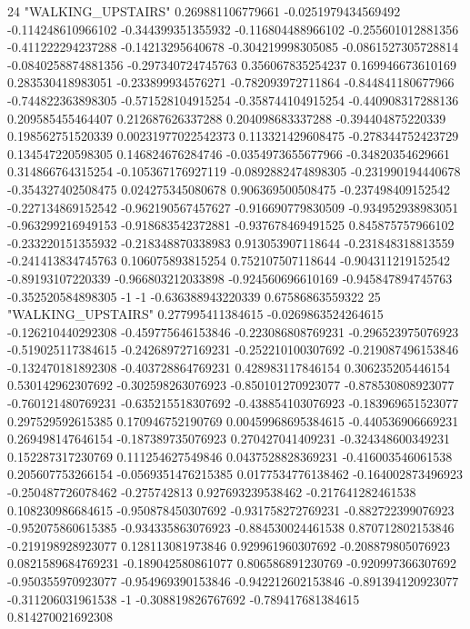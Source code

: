 24 "WALKING_UPSTAIRS" 0.269881106779661 -0.0251979434569492 -0.114248610966102 -0.344399351355932 -0.116804488966102 -0.255601012881356 -0.411222294237288 -0.14213295640678 -0.304219998305085 -0.0861527305728814 -0.0840258874881356 -0.297340724745763 0.356067835254237 0.169946673610169 0.283530418983051 -0.233899934576271 -0.782093972711864 -0.844841180677966 -0.744822363898305 -0.571528104915254 -0.358744104915254 -0.440908317288136 0.209585455464407 0.212687626337288 0.204098683337288 -0.394404875220339 0.198562751520339 0.00231977022542373 0.113321429608475 -0.278344752423729 0.134547220598305 0.146824676284746 -0.0354973655677966 -0.34820354629661 0.314866764315254 -0.105367176927119 -0.0892882474898305 -0.231990194440678 -0.354327402508475 0.024275345080678 0.906369500508475 -0.237498409152542 -0.227134869152542 -0.962190567457627 -0.916690779830509 -0.934952938983051 -0.963299216949153 -0.918683542372881 -0.937678469491525 0.845875757966102 -0.233220151355932 -0.218348870338983 0.913053907118644 -0.231848318813559 -0.241413834745763 0.106075893815254 0.752107507118644 -0.904311219152542 -0.89193107220339 -0.966803212033898 -0.924560696610169 -0.945847894745763 -0.352520584898305 -1 -1 -0.636388943220339 0.67586863559322
25 "WALKING_UPSTAIRS" 0.277995411384615 -0.0269863524264615 -0.126210440292308 -0.459775646153846 -0.223086808769231 -0.296523975076923 -0.519025117384615 -0.242689727169231 -0.252210100307692 -0.219087496153846 -0.132470181892308 -0.403728864769231 0.428983117846154 0.306235205446154 0.530142962307692 -0.302598263076923 -0.850101270923077 -0.878530808923077 -0.760121480769231 -0.635215518307692 -0.438854103076923 -0.183969651523077 0.297529592615385 0.170946752190769 0.00459968695384615 -0.440536906669231 0.269498147646154 -0.187389735076923 0.270427041409231 -0.324348600349231 0.152287317230769 0.111254627549846 0.0437528828369231 -0.416003546061538 0.205607753266154 -0.0569351476215385 0.0177534776138462 -0.164002873496923 -0.250487726078462 -0.275742813 0.927693239538462 -0.217641282461538 0.108230986684615 -0.950878450307692 -0.931758272769231 -0.882722399076923 -0.952075860615385 -0.934335863076923 -0.884530024461538 0.870712802153846 -0.219198928923077 0.128113081973846 0.929961960307692 -0.208879805076923 0.0821589684769231 -0.189042580861077 0.806586891230769 -0.920997366307692 -0.950355970923077 -0.954969390153846 -0.942212602153846 -0.891394120923077 -0.311206031961538 -1 -0.308819826767692 -0.789417681384615 0.814270021692308
